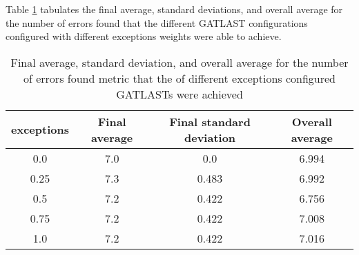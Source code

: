 Table \ref{tab:HP:GA:Exceptions:number of errors found} tabulates the final average, standard deviations, and overall average for the number of errors found that the different GATLAST configurations configured with different exceptions weights were able to achieve.
\begin{table}[tbh!]
\centering
\begin{adjustbox}{trim=0cm 0cm 0cm 0cm, clip=true}
\begin{tabular}{|c|c|c|c|}
\hline
exceptions & Final average & Final standard deviation & Overall average\\
\hline
0.0 & 7.0 & 0.0 & 6.994\\\hline
0.25 & 7.3 & 0.483 & 6.992\\\hline
0.5 & 7.2 & 0.422 & 6.756\\\hline
0.75 & 7.2 & 0.422 & 7.008\\\hline
1.0 & 7.2 & 0.422 & 7.016\\\hline
\end{tabular}
\end{adjustbox}
\caption{Final average, standard deviation, and overall average for the number of errors found metric that the of different exceptions configured GATLASTs were achieved}
\label{tab:HP:GA:Exceptions:number of errors found}
\end{table}
